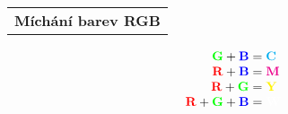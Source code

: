 \documentclass[12pt]{extarticle}
\begin{document}
\pagecolor{black}%
\color{white}
\parindent=0cm
\noindent
\hskip-1.70mm%
\setlength{\tabcolsep}{1.5pt}
\renewcommand*{\arraystretch}{1.037}
\begin{tabularx}{\textwidth}{l}
\textbf{Míchání barev RGB} \\
\end{tabularx}

\vspace{-3mm}
\Large\noindent
\begin{align*}
{\color{green} \mathbf{G}} + {\color{blue} \mathbf{B}} &= {\color{cyan} \mathbf{C}} \\[-1mm]
{\color{red} \mathbf{R}} + {\color{blue} \mathbf{B}} &= {\color{magenta} \mathbf{M}} \\[-1mm]
{\color{red} \mathbf{R}} + {\color{green} \mathbf{G}} &= {\color{yellow} \mathbf{Y}} \\[-1mm]
{\color{red} \mathbf{R}} + {\color{green} \mathbf{G}} + {\color{blue} \mathbf{B}} &= {\color{white} \mathbf{W}}
\end{align*}
\end{document}
